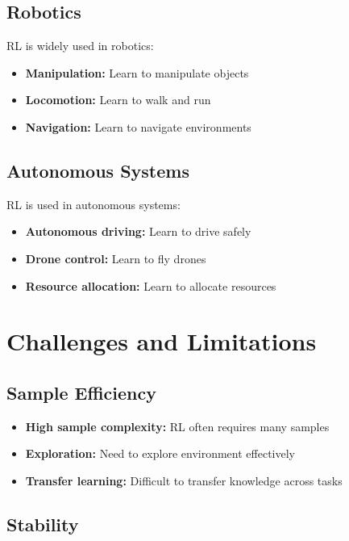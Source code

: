 \subsection{Robotics}

RL is widely used in robotics:
\begin{itemize}
    \item \textbf{Manipulation:} Learn to manipulate objects
    \item \textbf{Locomotion:} Learn to walk and run
    \item \textbf{Navigation:} Learn to navigate environments
\end{itemize}

\subsection{Autonomous Systems}

RL is used in autonomous systems:
\begin{itemize}
    \item \textbf{Autonomous driving:} Learn to drive safely
    \item \textbf{Drone control:} Learn to fly drones
    \item \textbf{Resource allocation:} Learn to allocate resources
\end{itemize}

\section{Challenges and Limitations}

\subsection{Sample Efficiency}

\begin{itemize}
    \item \textbf{High sample complexity:} RL often requires many samples
    \item \textbf{Exploration:} Need to explore environment effectively
    \item \textbf{Transfer learning:} Difficult to transfer knowledge across tasks
\end{itemize}

\subsection{Stability}


